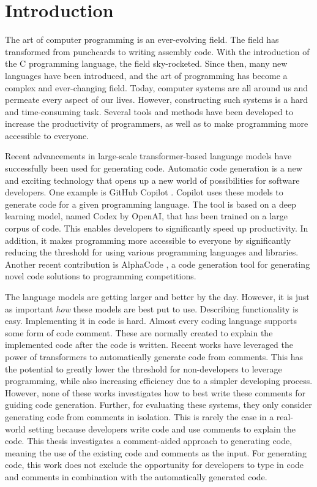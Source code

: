 \chapter{Introduction}
\label{chap:introduction}
The art of computer programming is an ever-evolving field. The field has transformed from punchcards to writing assembly code. With the introduction of the C programming language, the field sky-rocketed. Since then, many new languages have been introduced, and the art of programming has become a complex and ever-changing field. Today, computer systems are all around us and permeate every aspect of our lives. However, constructing such systems is a hard and time-consuming task. Several tools and methods have been developed to increase the productivity of programmers, as well as to make programming more accessible to everyone. 

Recent advancements in large-scale transformer-based language models have successfully been used for generating code. Automatic code generation is a new and exciting technology that opens up a new world of possibilities for software developers. One example is GitHub Copilot \cite{copilot}. Copilot uses these models to generate code for a given programming language. The tool is based on a deep learning model, named Codex \cite{chen2021codex} by OpenAI, that has been trained on a large corpus of code. This enables developers to significantly speed up productivity. In addition, it makes programming more accessible to everyone by significantly reducing the threshold for using various programming languages and libraries. Another recent contribution is AlphaCode \cite{alphacode}, a code generation tool for generating novel code solutions to programming competitions.

The language models are getting larger and better by the day. However, it is just as important \textit{how} these models are best put to use. Describing functionality is easy. Implementing it in code is hard. Almost every coding language supports some form of code comment. These are normally created to explain the implemented code after the code is written. Recent works \cite{chen2021codex,colin2020pymt5} have leveraged the power of transformers to automatically generate code from comments. This has the potential to greatly lower the threshold for non-developers to leverage programming, while also increasing efficiency due to a simpler developing process. However, none of these works investigates how to best write these comments for guiding code generation.  Further, for evaluating these systems, they only consider generating code from comments in isolation. This is rarely the case in a real-world setting because developers write code and use comments to explain the code. This thesis investigates a comment-aided approach to generating code, meaning the use of the existing code and comments as the input. For generating code, this work does not exclude the opportunity for developers to type in code and comments in combination with the automatically generated code. 

